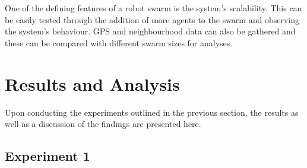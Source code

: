 One of the defining features of a robot swarm is the system's scalability. This can be easily tested through the addition of more agents to the swarm and observing the system's behaviour. GPS and neighbourhood data can also be gathered and these can be compared with different swarm sizes for analyses. 
\clearpage
\section{Results and Analysis}
\label{section:results}

Upon conducting the experiments outlined in the previous section, the results as well as a discussion of the findings are presented here.

\subsection{Experiment 1}

